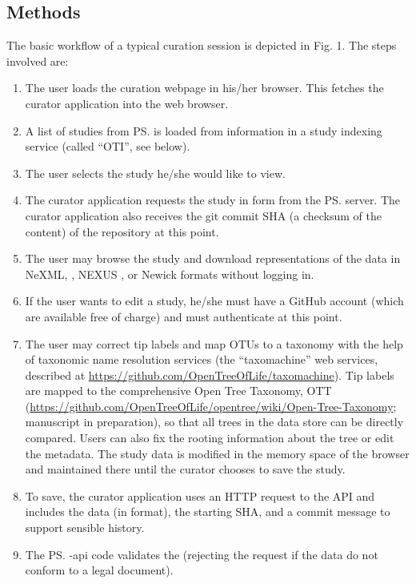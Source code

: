 \begin{methods}
\section{Methods}
The basic workflow of a typical curation session is depicted in Fig. 1. The steps involved are:
\begin{enumerate}
    \item \label{loadAppStep} The user loads the curation webpage in his/her browser.  This fetches the \js curator application into the web browser.
    \item \label{otiListStep} A list of studies from \ps is loaded from information in a study indexing service (called ``OTI'', see below).
    \item The user selects the study he/she would like to view.
    \item \label{getStudyStep} The curator application requests the study in \nexson form from the \ps server.
        The curator application also receives the git commit SHA (a checksum of the content) of the repository at this point.
    \item \label{browseStep} The user may browse the study and download representations of the data in NeXML, \nexson, NEXUS \cite{NEXUS}, or Newick formats without logging in.
    \item \label{authStep} If the user wants to edit a study, he/she must have a GitHub account (which are available free of charge) and must authenticate at this point.
    \item \label{userEditStep} The user may correct tip labels and map OTUs to a taxonomy with the help of taxonomic name resolution services (the ``taxomachine'' web services, described at
        \url{https://github.com/OpenTreeOfLife/taxomachine}). Tip labels are mapped to the 
        comprehensive Open Tree Taxonomy, OTT (\url{https://github.com/OpenTreeOfLife/opentree/wiki/Open-Tree-Taxonomy}; manuscript in preparation), so that all trees in the data 
        store can be directly compared. 
        Users can also fix the rooting information about the tree or edit the metadata.
        The study data is modified in the memory space of the
        browser and maintained there until the curator chooses to save the study.
    \item \label{putStep} To save, the curator application uses an
      HTTP request to the API and includes the data (in \nexson format), the starting SHA, and a commit message to support sensible history. 
    \item \label{validateStep} The \ps-api code validates the \nexson (rejecting the request if the data do not conform to a legal \nexson document).

\end{enumerate}
\end{methods}
